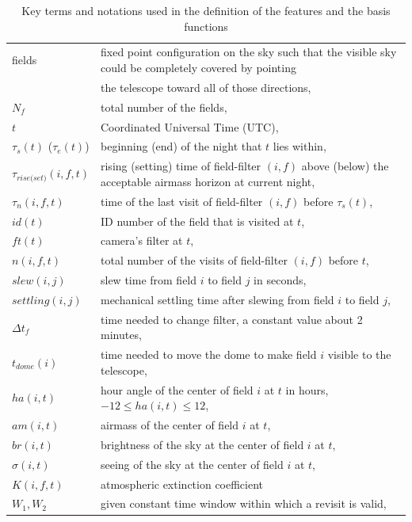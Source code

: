 \documentclass[12pt]{aastex62}
\theoremstyle{definition}
\begin{document}
\begin{table}[h]
\caption{Key terms and notations used in the definition of the features and the basis functions} \label{tab_notatopn}
\begin{tabular}{l  l }
\hline
fields & fixed point configuration on the sky such that the visible sky could be completely covered by pointing\\
& the telescope toward all of those directions, \\
$N_{f}$ & total number of the fields,\\
$t$& Coordinated Universal Time (UTC),\\ 
$\tau_s(t)$ ($\tau_e(t)$)& beginning (end) of the night that $t$ lies within,\\
$\tau_{rise\text{(}set\text{)}}(i,f,t)$ & rising (setting) time of field-filter $(i,f)$ above (below) the acceptable airmass horizon at current night,\\
$\tau_n(i,f,t)$& time of the last visit of field-filter $(i,f)$ before $\tau_s(t)$,\\
$id(t)$ & ID number of the field that is visited at $t$,\\
$ft(t)$& camera's filter at $t$,\\
$n(i,f,t)$ & total number of the visits of field-filter $(i,f)$ before $t$,\\
$slew(i,j)$& slew time from field $i$ to field $j$ in seconds,\\
$settling(i,j)$& mechanical settling time after slewing from field $i$ to field $j$,\\
$\Delta t_{f}$& time needed to change filter, a constant value about 2 minutes,\\
$t_{dome}(i)$& time needed to move the dome to make field $i$ visible to the telescope,\\
$ha(i,t)$ & hour angle of the center of field $i$ at $t$ in hours, $-12 \leq ha(i,t) \leq 12$,\\
$am(i,t)$ & airmass of the center of field $i$ at $t$,\\
$br(i,t)$ & brightness of the sky at the center of field $i$ at $t$,\\
$\sigma(i,t)$ & seeing of the sky at the center of field $i$ at $t$,\\
$K(i,f, t)$ & atmospheric extinction coefficient\\
$W_1, W_2$ & given constant time window within which a revisit is valid, \\
\hline
\end{tabular}
\end{table}
\end{document}
